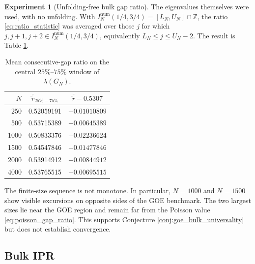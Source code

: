 \documentclass[11pt]{amsart}
\numberwithin{equation}{section}
\theoremstyle{plain}
\theoremstyle{definition}
\newtheorem{experiment}[theorem]{Experiment}
\theoremstyle{remark}
\begin{document}
\begin{experiment}[Unfolding-free bulk gap ratio]
\label{exp:bulk_gap_ratio}
The eigenvalues themselves were used, with no unfolding.  With $I_N^{\mathrm{num}}(1/4,3/4)=[L_N,U_N]\cap\mathbb Z$, the ratio \eqref{eq:ratio_statistic} was averaged over those $j$ for which $j,j+1,j+2\in I_N^{\mathrm{num}}(1/4,3/4)$, equivalently $L_N\le j\le U_N-2$.  The result is Table \ref{tab:bulk_ratio}.

\begin{table}[htbp]
\centering
\caption{Mean consecutive-gap ratio on the central $25\%$--$75\%$ window of $\lambda(G_N)$.}
\label{tab:bulk_ratio}
\begin{tabular}{rcc}
\toprule
$N$ & $\overline{\widetilde r}_{25\%-75\%}$ & $\overline{\widetilde r}-0.5307$\\
\midrule
250  & 0.52059191 & $-0.01010809$\\
500  & 0.53715389 & $+0.00645389$\\
1000 & 0.50833376 & $-0.02236624$\\
1500 & 0.54547846 & $+0.01477846$\\
2000 & 0.53914912 & $+0.00844912$\\
4000 & 0.53765515 & $+0.00695515$\\
\bottomrule
\end{tabular}
\end{table}

The finite-size sequence is not monotone.  In particular, $N=1000$ and $N=1500$ show visible excursions on opposite sides of the GOE benchmark.  The two largest sizes lie near the GOE region and remain far from the Poisson value \eqref{eq:poisson_gap_ratio}.  This supports Conjecture \ref{conj:goe_bulk_universality} but does not establish convergence.
\end{experiment}

\subsection{Bulk IPR}
\label{subsec:bulk_ipr_data}
\end{document}

